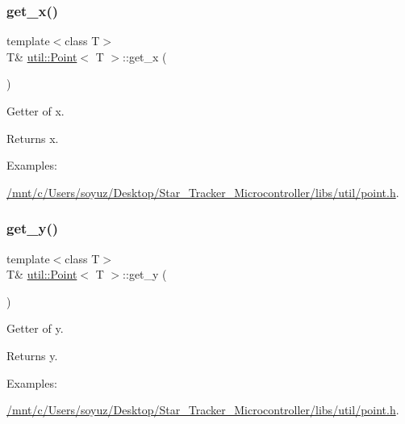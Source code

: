 \subsubsection{\texorpdfstring{get\+\_\+x()}{get\_x()}}
{\footnotesize\ttfamily template$<$class T$>$ \\
T\& \hyperlink{classutil_1_1Point}{util\+::\+Point}$<$ T $>$\+::get\+\_\+x (\begin{DoxyParamCaption}{ }\end{DoxyParamCaption})\hspace{0.3cm}{\ttfamily [inline]}}



Getter of x. 

\begin{DoxyReturn}{Returns}
x. 
\end{DoxyReturn}
\begin{Desc}
\item[Examples\+: ]\par
\hyperlink{_2mnt_2c_2Users_2soyuz_2Desktop_2Star_Tracker_Microcontroller_2libs_2util_2point_8h-example}{/mnt/c/\+Users/soyuz/\+Desktop/\+Star\+\_\+\+Tracker\+\_\+\+Microcontroller/libs/util/point.\+h}.\end{Desc}
\mbox{\label{classutil_1_1Point_aaf8b4a81f8cb3b841efac6009e849545}} 
\subsubsection{\texorpdfstring{get\+\_\+y()}{get\_y()}}
{\footnotesize\ttfamily template$<$class T$>$ \\
T\& \hyperlink{classutil_1_1Point}{util\+::\+Point}$<$ T $>$\+::get\+\_\+y (\begin{DoxyParamCaption}{ }\end{DoxyParamCaption})\hspace{0.3cm}{\ttfamily [inline]}}



Getter of y. 

\begin{DoxyReturn}{Returns}
y. 
\end{DoxyReturn}
\begin{Desc}
\item[Examples\+: ]\par
\hyperlink{_2mnt_2c_2Users_2soyuz_2Desktop_2Star_Tracker_Microcontroller_2libs_2util_2point_8h-example}{/mnt/c/\+Users/soyuz/\+Desktop/\+Star\+\_\+\+Tracker\+\_\+\+Microcontroller/libs/util/point.\+h}.\end{Desc}
\mbox{\label{classutil_1_1Point_aae6e38572d0141a2a819dfab3ea15eae}} 
